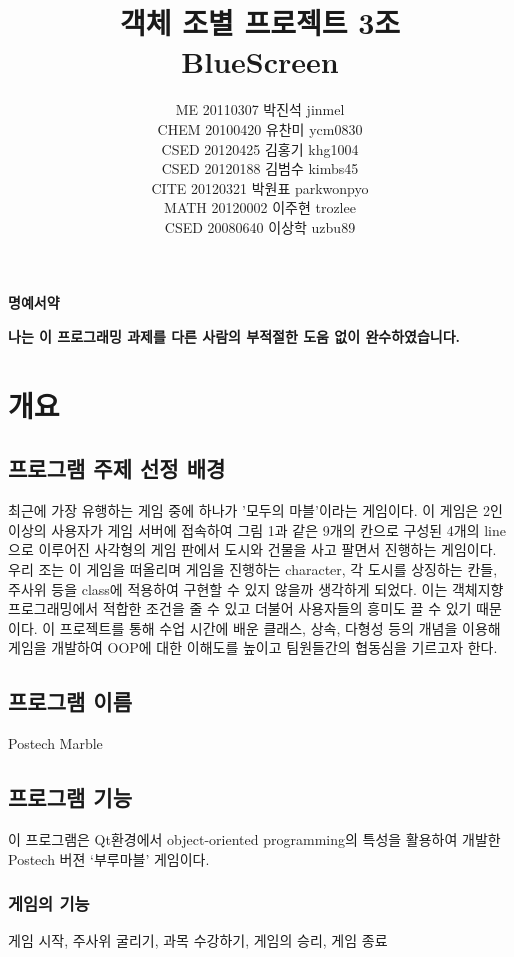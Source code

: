\documentclass[10pt,oneside,a4paper,titlepage]{article}
\title{객체 조별 프로젝트 3조\\
BlueScreen}
\author{
ME   20110307 박진석 jinmel\\
CHEM 20100420 유찬미 ycm0830\\
CSED 20120425 김홍기 khg1004\\ 
CSED 20120188 김범수 kimbs45\\
CITE 20120321 박원표 parkwonpyo\\
MATH 20120002 이주현 trozlee\\
CSED 20080640 이상학 uzbu89
}
\begin{document}
\maketitle

\newpage

\begin{center}
{\Huge\textbf{명예서약}}
\end{center}

\begin{center}
{\Large\textbf{나는 이 프로그래밍 과제를 다른 사람의 부적절한 도움 없이 완수하였습니다.}}
\end{center}
\newpage

\tableofcontents
\listoffigures
\lstlistoflistings
\newpage

\section{개요}

\subsection{프로그램 주제 선정 배경}
최근에 가장 유행하는 게임 중에 하나가 '모두의 마블'이라는 게임이다. 이 게임은 2인 이상의 사용자가 게임 서버에 접속하여 그림 1과 같은 9개의 칸으로 구성된 4개의 line으로 이루어진 사각형의 게임 판에서 도시와 건물을 사고 팔면서 진행하는 게임이다. 우리 조는 이 게임을 떠올리며 게임을 진행하는 character, 각 도시를 상징하는 칸들, 주사위 등을 class에 적용하여 구현할 수 있지 않을까 생각하게 되었다. 이는 객체지향 프로그래밍에서 적합한 조건을 줄 수 있고 더불어 사용자들의 흥미도 끌 수 있기 때문이다. 
이 프로젝트를 통해 수업 시간에 배운 클래스, 상속, 다형성 등의 개념을 이용해 게임을 개발하여 OOP에 대한 이해도를 높이고 팀원들간의 협동심을 기르고자 한다. 
\subsection{프로그램 이름}
Postech Marble
\subsection{프로그램 기능}
이 프로그램은 Qt환경에서 object-oriented programming의 특성을 활용하여 개발한 Postech 버젼 ‘부루마블’ 게임이다.



\subsubsection{게임의 기능}
게임 시작, 주사위 굴리기, 과목 수강하기, 게임의 승리, 게임 종료
\end{document}

